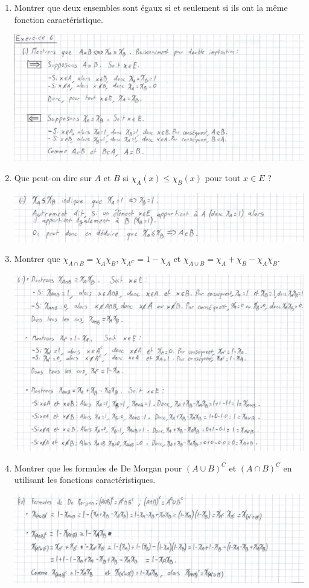 \documentclass[a4paper, 10pt]{report}
\begin{document}
	\begin{enumerate}[label=(\roman*)]
		\item Montrer que deux ensembles sont égaux si et seulement
		si ils ont la même fonction caractéristique.
		
		\includegraphics{ex06-1.jpg}
		\item Que peut-on dire sur $A$ et $B$ si
		$\chi_A(x) \leq \chi_B(x)$ pour tout $x \in E$ ?
		
		\includegraphics{ex06-2.jpg}
		\item Montrer que $\chi_{A \cap B} = \chi_A \chi_B$,
		$\chi_{A^C} = 1 - \chi_A$ et
		$\chi_{A \cup B} = \chi_A + \chi_B - \chi_A \chi_B$.
		
		\includegraphics{ex06-3.jpg}
		\item Montrer que les formules de De Morgan pour $(A \cup B)^C$
		et $(A \cap B)^C$ en utilisant les fonctions caractéristiques.
		
		\includegraphics{ex06-4.jpg}
	\end{enumerate}
	
\end{document}
